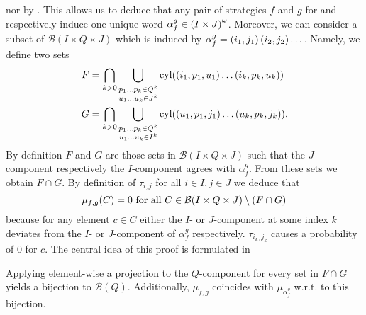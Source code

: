 \eve{} nor by \adam{}. This allows us to deduce that any pair of 
strategies $f$ and $g$ for \eve{} and \adam{} respectively induce one unique
word $\alpha_{f}^{g}\in\left(I\times J\right)^{\omega}$. Moreover, we can consider
a subset of $\mathcal{B}(I\times Q\times J)$ which is induced by 
$\alpha_{f}^{g} = \left(i_{1}, j_{1}\right)\left(i_{2}, j_{2}\right)\dots$. Namely, we 
define two sets
\begin{align*}
  F &= \bigcap_{k>0}\bigcup_{
    \substack{
      p_{1}\dots p_{k}\in Q^{k}\\
      u_{1}\dots u_{k}\in J^{k}
    }
  }\operatorname{cyl}(\left(i_{1}, p_{1}, u_{1}\right)\dots\left(i_{k}, p_{k}, u_{k}\right))\\
  G &= \bigcap_{k>0}\bigcup_{
    \substack{
      p_{1}\dots p_{k}\in Q^{k}\\
      u_{1}\dots u_{k}\in I^{k}
    }
  }\operatorname{cyl}(\left(u_{1}, p_{1}, j_{1}\right)\dots\left(u_{k}, p_{k}, j_{k}\right)).
\end{align*}
By definition $F$ and $G$ are those sets in $\mathcal{B}(I\times Q\times J)$ 
such that the $J$-component respectively the $I$-component agrees with 
$\alpha_{f}^{g}$. From these sets we obtain $F\cap G$.
By definition of $\tau_{i, j}$ for all $i\in I, j\in J$ we deduce that 
\begin{equation*}
  \mu_{f,g}(C) = 0\text{ for all }
  C\in \mathcal{B}(I\times Q\times J)\setminus\left(F\cap G\right)
\end{equation*}
because for any element $c\in C$ either the $I$- or $J$-component at some 
index $k$ deviates from the $I$- or $J$-component of $\alpha_{f}^{g}$ 
respectively. $\tau_{i_{k}, j_{k}}$ causes a probability of $0$ for $c$.
The central idea of this proof is formulated in
\begin{lemma}
  Applying element-wise a projection to the $Q$-component for every set in 
  $F\cap G$ yields a bijection to $\mathcal{B}(Q)$. Additionally, $\mu_{f,g}$ 
  coincides with $\mu_{\alpha_{f}^{g}}$ w.r.t. to this bijection.
  \label{lem:fginpba}
\end{lemma}
